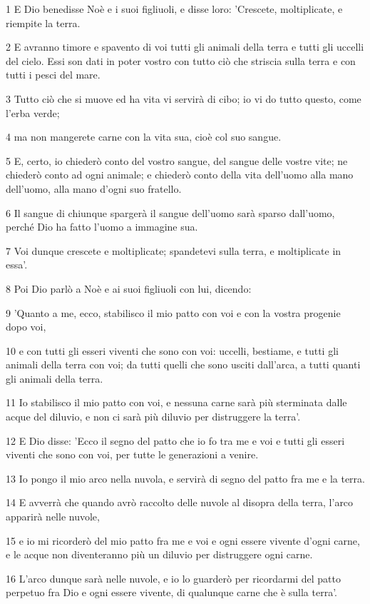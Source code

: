 \par 1 E Dio benedisse Noè e i suoi figliuoli, e disse loro: 'Crescete, moltiplicate, e riempite la terra.
\par 2 E avranno timore e spavento di voi tutti gli animali della terra e tutti gli uccelli del cielo. Essi son dati in poter vostro con tutto ciò che striscia sulla terra e con tutti i pesci del mare.
\par 3 Tutto ciò che si muove ed ha vita vi servirà di cibo; io vi do tutto questo, come l'erba verde;
\par 4 ma non mangerete carne con la vita sua, cioè col suo sangue.
\par 5 E, certo, io chiederò conto del vostro sangue, del sangue delle vostre vite; ne chiederò conto ad ogni animale; e chiederò conto della vita dell'uomo alla mano dell'uomo, alla mano d'ogni suo fratello.
\par 6 Il sangue di chiunque spargerà il sangue dell'uomo sarà sparso dall'uomo, perché Dio ha fatto l'uomo a immagine sua.
\par 7 Voi dunque crescete e moltiplicate; spandetevi sulla terra, e moltiplicate in essa'.
\par 8 Poi Dio parlò a Noè e ai suoi figliuoli con lui, dicendo:
\par 9 'Quanto a me, ecco, stabilisco il mio patto con voi e con la vostra progenie dopo voi,
\par 10 e con tutti gli esseri viventi che sono con voi: uccelli, bestiame, e tutti gli animali della terra con voi; da tutti quelli che sono usciti dall'arca, a tutti quanti gli animali della terra.
\par 11 Io stabilisco il mio patto con voi, e nessuna carne sarà più sterminata dalle acque del diluvio, e non ci sarà più diluvio per distruggere la terra'.
\par 12 E Dio disse: 'Ecco il segno del patto che io fo tra me e voi e tutti gli esseri viventi che sono con voi, per tutte le generazioni a venire.
\par 13 Io pongo il mio arco nella nuvola, e servirà di segno del patto fra me e la terra.
\par 14 E avverrà che quando avrò raccolto delle nuvole al disopra della terra, l'arco apparirà nelle nuvole,
\par 15 e io mi ricorderò del mio patto fra me e voi e ogni essere vivente d'ogni carne, e le acque non diventeranno più un diluvio per distruggere ogni carne.
\par 16 L'arco dunque sarà nelle nuvole, e io lo guarderò per ricordarmi del patto perpetuo fra Dio e ogni essere vivente, di qualunque carne che è sulla terra'.
